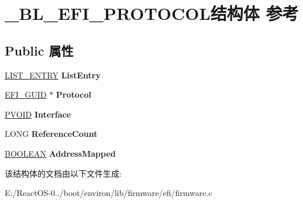 \hypertarget{struct___b_l___e_f_i___p_r_o_t_o_c_o_l}{}\section{\+\_\+\+B\+L\+\_\+\+E\+F\+I\+\_\+\+P\+R\+O\+T\+O\+C\+O\+L结构体 参考}
\label{struct___b_l___e_f_i___p_r_o_t_o_c_o_l}
\subsection*{Public 属性}
\begin{DoxyCompactItemize}
\item 
\mbox{\label{struct___b_l___e_f_i___p_r_o_t_o_c_o_l_afb7305901090a2284cce4ca1dcddc232}} 
\hyperlink{struct___l_i_s_t___e_n_t_r_y}{L\+I\+S\+T\+\_\+\+E\+N\+T\+RY} {\bfseries List\+Entry}
\item 
\mbox{\label{struct___b_l___e_f_i___p_r_o_t_o_c_o_l_a28b059b296c615f72eb1d0cb4c7191e1}} 
\hyperlink{_uefi_base_type_8h_ad87614428813f71edb2c2d802e9ce2af}{E\+F\+I\+\_\+\+G\+U\+ID} $\ast$ {\bfseries Protocol}
\item 
\mbox{\label{struct___b_l___e_f_i___p_r_o_t_o_c_o_l_a9a545e761f3bbf62d9d93144fa526d39}} 
\hyperlink{interfacevoid}{P\+V\+O\+ID} {\bfseries Interface}
\item 
\mbox{\label{struct___b_l___e_f_i___p_r_o_t_o_c_o_l_a810fe0282cb01ae0a7cfd60def46a6db}} 
L\+O\+NG {\bfseries Reference\+Count}
\item 
\mbox{\label{struct___b_l___e_f_i___p_r_o_t_o_c_o_l_a2a180547286b47c8b6dae6ba5e845f25}} 
\hyperlink{_processor_bind_8h_a112e3146cb38b6ee95e64d85842e380a}{B\+O\+O\+L\+E\+AN} {\bfseries Address\+Mapped}
\end{DoxyCompactItemize}


该结构体的文档由以下文件生成\+:\begin{DoxyCompactItemize}
\item 
E\+:/\+React\+O\+S-\/0../boot/environ/lib/firmware/efi/firmware.\+c\end{DoxyCompactItemize}
